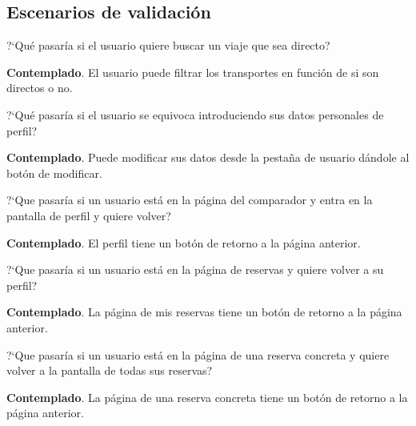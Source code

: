 \subsection{Escenarios de validación}
\begin{escenario} %
    \centering
    ?`Qué pasaría si el usuario quiere buscar un viaje que sea directo?
    \begin{solucion} \centering
          \textbf{Contemplado}. El usuario puede filtrar los transportes en función de si son directos o no.
    \end{solucion}
\end{escenario}

\begin{escenario} %
    \centering
    ?`Qué pasaría si el usuario se equivoca introduciendo sus datos personales de perfil?

    \begin{solucion} \centering
          \textbf{Contemplado}. Puede modificar sus datos desde la pestaña de usuario dándole al botón de modificar.
    \end{solucion}
\end{escenario}

\begin{escenario} %
    \centering
    ?`Que pasaría si un usuario está en la página del comparador y entra en la pantalla de perfil y quiere volver?

    \begin{solucion} \centering
          \textbf{Contemplado}. El perfil tiene un botón de retorno a la página anterior.
    \end{solucion}
\end{escenario}

\begin{escenario} %
    \centering
    ?`Que pasaría si un usuario está en la página de reservas y quiere volver a su perfil?

    \begin{solucion} \centering
          \textbf{Contemplado}. La página de mis reservas tiene un botón de retorno a la página anterior.
    \end{solucion}
\end{escenario}

\begin{escenario} %
    \centering
    ?`Que pasaría si un usuario está en la página de una reserva concreta y quiere volver a la pantalla de todas sus reservas?

    \begin{solucion} \centering
          \textbf{Contemplado}. La página de una reserva concreta tiene un botón de retorno a la página anterior.
    \end{solucion}
\end{escenario}

